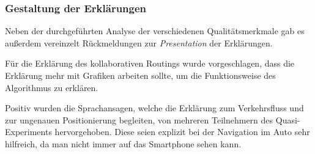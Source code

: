 \subsubsection{Gestaltung der Erklärungen}

Neben der durchgeführten Analyse der verschiedenen Qualitätsmerkmale gab es außerdem vereinzelt Rückmeldungen zur \textit{Presentation} der Erklärungen.

Für die Erklärung des kollaborativen Routings wurde vorgeschlagen, dass die Erklärung mehr mit Grafiken arbeiten sollte, um die Funktionsweise des Algorithmus zu erklären.

Positiv wurden die Sprachansagen, welche die Erklärung zum Verkehrsfluss und zur ungenauen Positionierung begleiten, von mehreren Teilnehmern des Quasi-Experiments hervorgehoben. Diese seien explizit bei der Navigation im Auto sehr hilfreich, da man nicht immer auf das Smartphone sehen kann. 